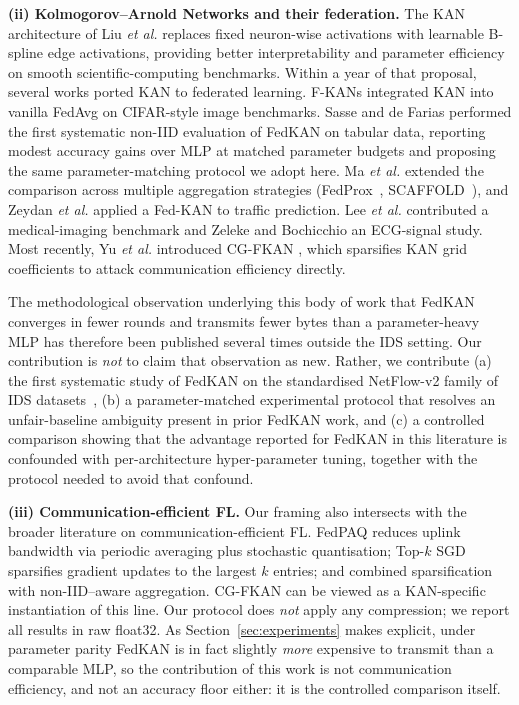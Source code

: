 \textbf{(ii) Kolmogorov--Arnold Networks and their federation.} The KAN architecture of Liu \emph{et al.} \cite{liu2024kan} replaces fixed neuron-wise activations with learnable B-spline edge activations, providing better interpretability and parameter efficiency on smooth scientific-computing benchmarks. Within a year of that proposal, several works ported KAN to federated learning. F-KANs \cite{zeydan2024fkans} integrated KAN into vanilla FedAvg on CIFAR-style image benchmarks. Sasse and de Farias \cite{sasse2024evaluating} performed the first systematic non-IID evaluation of FedKAN on tabular data, reporting modest accuracy gains over MLP at matched parameter budgets and proposing the same parameter-matching protocol we adopt here. Ma \emph{et al.} \cite{ma2025enhancing} extended the comparison across multiple aggregation strategies (FedProx~\cite{li2020fedprox}, SCAFFOLD~\cite{karimireddy2020scaffold}), and Zeydan \emph{et al.} \cite{zeydan2025fedkan} applied a Fed-KAN to traffic prediction. Lee \emph{et al.} \cite{lee2025unified} contributed a medical-imaging benchmark and Zeleke and Bochicchio \cite{zeleke2024federated} an ECG-signal study. Most recently, Yu \emph{et al.} introduced CG-FKAN \cite{yu2025cgfkan}, which sparsifies KAN grid coefficients to attack communication efficiency directly.

The methodological observation underlying this body of work that FedKAN converges in fewer rounds and transmits fewer bytes than a parameter-heavy MLP has therefore been published several times outside the IDS setting. Our contribution is \emph{not} to claim that observation as new. Rather, we contribute (a) the first systematic study of FedKAN on the standardised NetFlow-v2 family of IDS datasets~\cite{sarhan2022standard}, (b) a parameter-matched experimental protocol that resolves an unfair-baseline ambiguity present in prior FedKAN work, and (c) a controlled comparison showing that the advantage reported for FedKAN in this literature is confounded with per-architecture hyper-parameter tuning, together with the protocol needed to avoid that confound.

\textbf{(iii) Communication-efficient FL.} Our framing also intersects with the broader literature on communication-efficient FL. FedPAQ \cite{reisizadeh2020fedpaq} reduces uplink bandwidth via periodic averaging plus stochastic quantisation; Top-$k$ SGD \cite{aji2017topk} sparsifies gradient updates to the largest $k$ entries; and \cite{sattler2019sparse} combined sparsification with non-IID--aware aggregation. CG-FKAN \cite{yu2025cgfkan} can be viewed as a KAN-specific instantiation of this line. Our protocol does \emph{not} apply any compression; we report all results in raw float32. As Section~\ref{sec:experiments} makes explicit, under parameter parity FedKAN is in fact slightly \emph{more} expensive to transmit than a comparable MLP, so the contribution of this work is not communication efficiency, and not an accuracy floor either: it is the controlled comparison itself.
